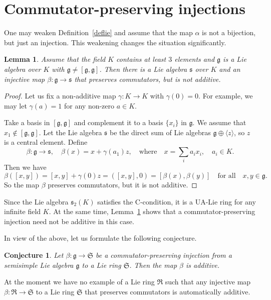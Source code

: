 \documentclass[a4paper,draft,reqno,12pt]{amsart}
\newtheorem{conjecture}{Conjecture}
\newtheorem{lemma}{Lemma}
\theoremstyle{definition}
\theoremstyle{remark}
\def\RRR{\mathfrak{R}}
\def\SSS{\mathfrak{S}}
\def\ggg{\mathfrak{g}}
\def\sss{\mathfrak{s}}
\begin{document}
\section{Commutator-preserving injections} 
\label{cpi}

One may weaken Definition~\ref{deflie} and assume that the map $\alpha$ is not a bijection, but just an injection. This weakening changes the situation significantly. 

\begin{lemma}
\label{pol}
Assume that the field $K$ contains at least $3$ elements and $\ggg$ is a Lie algebra over $K$ with $\ggg\ne [\ggg,\ggg]$. Then there is a Lie algebra $\sss$ over $K$ and an injective
map $\beta\colon\ggg\to\sss$ that preserves commutators, but is not additive. 
\end{lemma}

\begin{proof}
Let us fix a non-additive map $\gamma\colon K\to K$ with $\gamma(0)=0$. For example, we may let $\gamma(a)=1$ for any non-zero $a\in K$. 

Take a basis in $[\ggg,\ggg]$ and complement it to a basis $\{x_i\}$ in $\ggg$. We assume that $x_1\notin [\ggg,\ggg]$. Let the Lie algebra $\sss$ be the direct sum of Lie algebras
$\ggg\oplus\langle z\rangle$, so $z$ is a central element. Define 
$$
\beta\colon\ggg\to\sss, \quad \beta(x)=x+\gamma(a_1)z, \quad \text{where} \quad x=\sum_i a_ix_i, \quad a_i\in K.
$$
Then we have
$$
\beta([x,y])=[x,y]+\gamma(0)z=([x,y],0)=[\beta(x),\beta(y)] \quad \text{for all} \quad x,y\in\ggg.
$$
So the map $\beta$ preserves commutators, but it is not additive. 
\end{proof}

Since the Lie algebra $\sss_2(K)$ satisfies the C-condition, it is a UA-Lie ring for any infinite field $K$. 
At the same time, Lemma~\ref{pol} shows that a commutator-preserving injection need not be additive in this case. 

\smallskip

In view of the above, let us formulate the following conjecture. 

\begin{conjecture}
Let $\beta\colon\ggg\to\SSS$ be a commutator-preserving injection from a semisimple Lie algebra $\ggg$ to a Lie ring $\SSS$. Then the map $\beta$ is additive.  
\end{conjecture}

At the moment we have no example of a Lie ring $\RRR$ such that any injective map $\beta\colon\RRR\to\SSS$ to a Lie ring $\SSS$ that preserves commutators is automatically additive. 
\end{document}
